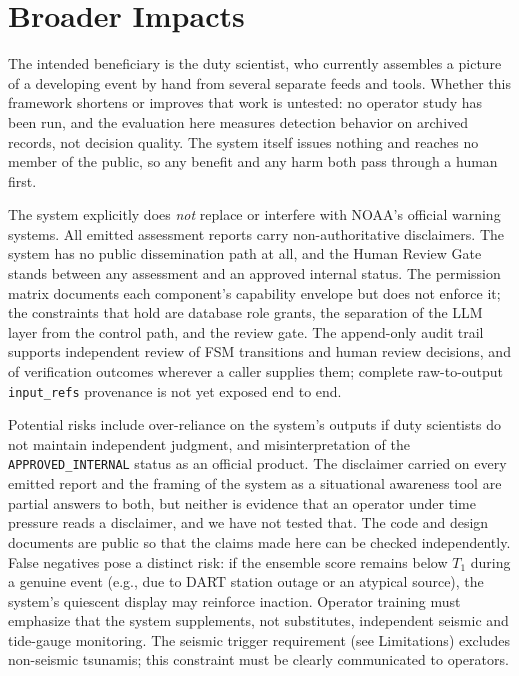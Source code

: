 \documentclass{article}
\begin{document}

\section{Broader Impacts}

The intended beneficiary is the duty scientist, who currently
assembles a picture of a developing event by hand from several
separate feeds and tools.  Whether this framework shortens or improves
that work is untested: no operator study has been run, and the
evaluation here measures detection behavior on archived records, not
decision quality.  The system itself issues nothing and reaches no
member of the public, so any benefit and any harm both pass through a
human first.

The system explicitly does \emph{not} replace or
interfere with NOAA's official warning systems. All emitted assessment
reports carry non-authoritative disclaimers. The system has no public
dissemination path at all, and the Human Review Gate stands between
any assessment and an approved internal status. The permission matrix documents each component's capability envelope
but does not enforce it; the constraints that hold are database role
grants, the separation of the LLM layer from the control path, and the
review gate. The append-only audit trail
supports independent review of FSM transitions and human review
decisions, and of verification outcomes wherever a caller supplies
them; complete raw-to-output
\texttt{input\_refs} provenance is not yet exposed end to end.

Potential risks include over-reliance on the system's outputs if duty
scientists do not maintain independent judgment, and misinterpretation
of the \texttt{APPROVED\_INTERNAL} status as an official product.  The
disclaimer carried on every emitted report and the framing of the
system as a situational awareness tool are partial answers to both,
but neither is evidence that an operator under time pressure reads a
disclaimer, and we have not tested that.  The code and design
documents are public so that the claims made here can be checked
independently.
False negatives pose a distinct risk: if the ensemble score remains
below $T_1$ during a genuine event (e.g., due to DART station
outage or an atypical source), the system's quiescent display may
reinforce inaction.  Operator training must emphasize that the
system supplements, not substitutes, independent seismic and
tide-gauge monitoring.
The seismic trigger requirement (see Limitations) excludes
non-seismic tsunamis; this constraint must be clearly communicated
to operators.
\end{document}
